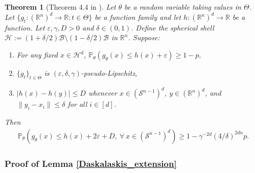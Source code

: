\documentclass[11pt]{article}
\newcommand{\R}{\mathbb{R}}
\newcommand{\Pro}{\mathbb{P}}
\newcommand{\Scal}{\mathcal{S}}
\renewcommand{\epsilon}{\varepsilon}
\newcommand{\Bcal}{\mathcal{B}}
\newtheorem{theorem}{Theorem}
\begin{document}
\begin{theorem}[Theorem 4.4 in \cite{Daskalaskisetal2020}] \label{pseudo_lipschitz_theorem}
Let $\theta$ be a random variable taking values in $\Theta$. Let $\{g_t : (\R^n)^{d} \rightarrow \R : t \in \Theta\}$ be a function family and let $h : (\R^n)^{d} \rightarrow \R$ be a function. Let $\epsilon,\gamma,D > 0$ and $\delta \in (0,1)$. Define the spherical shell $\mathcal{H} := (1 + \delta/2)\Bcal \setminus (1 - \delta/2)\Bcal$ in $\R^n$. Suppose: \begin{enumerate}
    \item For any fixed $x \in \mathcal{H}^d$, $\Pro_{\theta}(g_{\theta}(x) \leqslant h(x) + \epsilon) \geqslant 1 - p,$
    \item $\{g_t\}_{t \in \Theta}$ is $(\epsilon,\delta,\gamma)$-pseudo-Lipschitz,
    \item $|h(x)-h(y)|\leqslant D$ whenever $x \in (\Scal^{n-1})^d$, $y \in (\R^n)^d$, and $\|y_i - x_i\|\leqslant \delta$ for all $i \in [d]$. 
\end{enumerate} Then \begin{align*}
    \Pro_{\theta}\left(g_{\theta}(x) \leqslant h(x) + 2\epsilon + D,\ \forall\ x \in (\Scal^{n-1})^d\right) \geqslant 1 - \gamma^{-2d}(4/\delta)^{2dn}p.
\end{align*}
\end{theorem}

\subsubsection{Proof of Lemma \ref{Daskalaskis_extension}}
\end{document}
